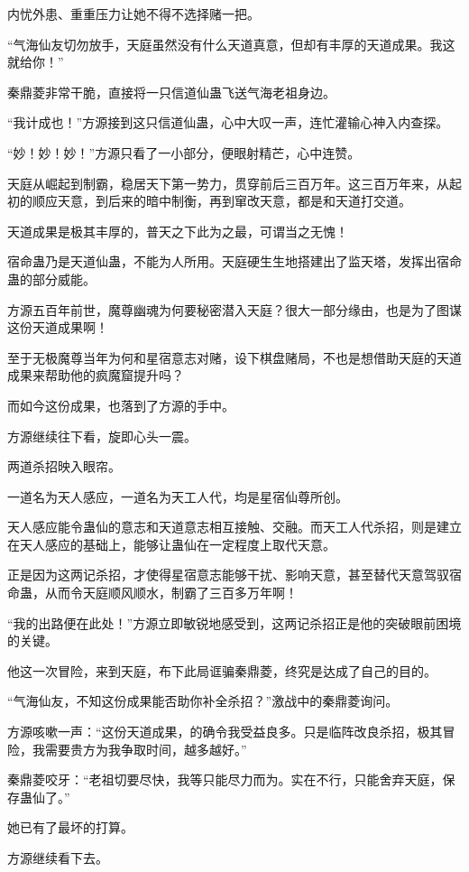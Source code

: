 \begin{this_body}
内忧外患、重重压力让她不得不选择赌一把。

“气海仙友切勿放手，天庭虽然没有什么天道真意，但却有丰厚的天道成果。我这就给你！”

秦鼎菱非常干脆，直接将一只信道仙蛊飞送气海老祖身边。

“我计成也！”方源接到这只信道仙蛊，心中大叹一声，连忙灌输心神入内查探。

“妙！妙！妙！”方源只看了一小部分，便眼射精芒，心中连赞。

天庭从崛起到制霸，稳居天下第一势力，贯穿前后三百万年。这三百万年来，从起初的顺应天意，到后来的暗中制衡，再到窜改天意，都是和天道打交道。

天道成果是极其丰厚的，普天之下此为之最，可谓当之无愧！

宿命蛊乃是天道仙蛊，不能为人所用。天庭硬生生地搭建出了监天塔，发挥出宿命蛊的部分威能。

方源五百年前世，魔尊幽魂为何要秘密潜入天庭？很大一部分缘由，也是为了图谋这份天道成果啊！

至于无极魔尊当年为何和星宿意志对赌，设下棋盘赌局，不也是想借助天庭的天道成果来帮助他的疯魔窟提升吗？

而如今这份成果，也落到了方源的手中。

方源继续往下看，旋即心头一震。

两道杀招映入眼帘。

一道名为天人感应，一道名为天工人代，均是星宿仙尊所创。

天人感应能令蛊仙的意志和天道意志相互接触、交融。而天工人代杀招，则是建立在天人感应的基础上，能够让蛊仙在一定程度上取代天意。

正是因为这两记杀招，才使得星宿意志能够干扰、影响天意，甚至替代天意驾驭宿命蛊，从而令天庭顺风顺水，制霸了三百多万年啊！

“我的出路便在此处！”方源立即敏锐地感受到，这两记杀招正是他的突破眼前困境的关键。

他这一次冒险，来到天庭，布下此局诓骗秦鼎菱，终究是达成了自己的目的。

“气海仙友，不知这份成果能否助你补全杀招？”激战中的秦鼎菱询问。

方源咳嗽一声：“这份天道成果，的确令我受益良多。只是临阵改良杀招，极其冒险，我需要贵方为我争取时间，越多越好。”

秦鼎菱咬牙：“老祖切要尽快，我等只能尽力而为。实在不行，只能舍弃天庭，保存蛊仙了。”

她已有了最坏的打算。

方源继续看下去。


\end{this_body}
